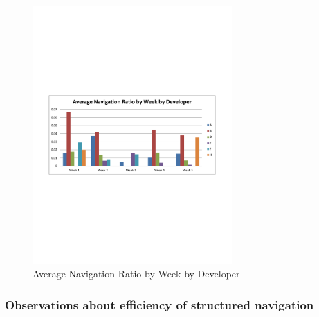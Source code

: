 \documentclass{sig-alternate}
\begin{document}


\begin{figure}\begin{mdframed}[linecolor=white]
	\includegraphics[width=3in]{navigationaverage.pdf}
	\caption{Average Navigation Ratio by Week by Developer}
	\label{fig:navigationaverage}
\end{mdframed}\end{figure}

\subsubsection{Observations about efficiency of structured navigation}
\end{document}
